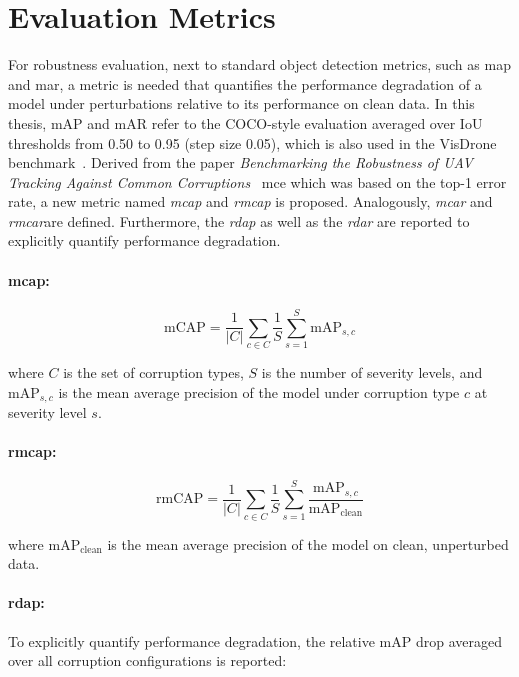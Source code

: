 \documentclass[final,twoside]{vutinfth}
\begin{document}
\section{Evaluation Metrics}
For robustness evaluation, next to standard object detection metrics, such as \gls{map} and \gls{mar}, a metric is needed that quantifies the performance degradation of a model under perturbations relative to its performance on clean data.
In this thesis, mAP and mAR refer to the COCO-style evaluation averaged over IoU thresholds from 0.50 to 0.95 (step size 0.05), which is also used in the VisDrone benchmark~\cite{zhu2021detection}.
Derived from the paper \emph{Benchmarking the Robustness of UAV Tracking Against Common Corruptions}~\cite{liu2024UAVRobustness} \gls{mce} which was based on the top-1 error rate, a new metric named \emph{\gls{mcap}} and \emph{\gls{rmcap}} is proposed.
Analogously, \emph{\gls{mcar}} and \emph{\gls{rmcar}}are defined.
Furthermore, the \emph{\gls{rdap}} as well as the \emph{\gls{rdar}} are reported to explicitly quantify performance degradation.

\paragraph{\gls{mcap}:} 

\begin{equation}
\mathrm{mCAP}
=
\frac{1}{|C|}
\sum_{c \in C}
\frac{1}{S}
\sum_{s=1}^{S}
\mathrm{mAP}_{s,c}
\end{equation}

where $C$ is the set of corruption types, $S$ is the number of severity levels, and $\mathrm{mAP}_{s,c}$ is the mean average precision of the model under corruption type $c$ at severity level $s$.

\paragraph{\gls{rmcap}:}
\begin{equation}
\mathrm{rmCAP}
=
\frac{1}{|C|}
\sum_{c \in C}
\frac{1}{S}
\sum_{s=1}^{S}
\frac{\mathrm{mAP}_{s,c}}{\mathrm{mAP}_{\mathrm{clean}}}
\end{equation}

where $\mathrm{mAP}_{\mathrm{clean}}$ is the mean average precision of the model on clean, unperturbed data.

\paragraph{\gls{rdap}:}
To explicitly quantify performance degradation, the relative mAP drop averaged over all corruption configurations is reported:
\end{document}
